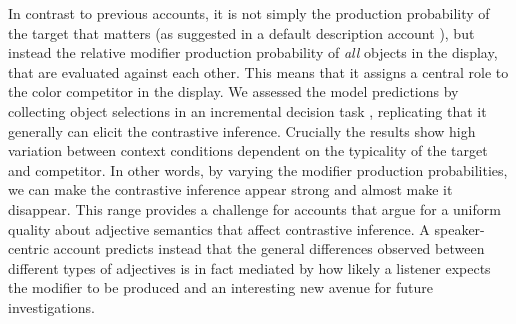 \documentclass[10pt,letterpaper]{article}
\newcommand{\ek}[1]{\textcolor{Orange}{[ek: #1]}}
\begin{document}
In contrast to previous accounts, it is not simply the production probability of the target that matters (as suggested in a default description account \cite{Sedivy:2003}), but instead the relative modifier production probability of \emph{all} objects in the display, that are evaluated against each other. This means that it assigns a central role to the color competitor in the display. 
We assessed the model predictions by collecting object selections in an incremental decision task \cite{Qing:2018}, replicating that it generally can elicit the contrastive inference. Crucially the results show high variation between context conditions dependent on the typicality of the target and competitor. In other words, by varying the modifier production probabilities, we can make the contrastive inference appear strong and almost make it disappear. This range provides a challenge for accounts that argue for a uniform quality about adjective semantics that affect contrastive inference. A speaker-centric account predicts instead that the general differences observed between different types of adjectives is in fact mediated by how likely a listener expects the modifier to be produced and an interesting new avenue for future investigations.

















\end{document}

